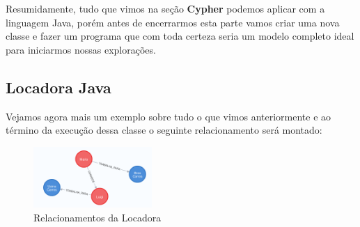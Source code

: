 Resumidamente, tudo que vimos na seção \textbf{Cypher} podemos aplicar com a linguagem Java, porém antes de encerrarmos esta parte vamos criar uma nova classe e fazer um programa que com toda certeza seria um modelo completo ideal para iniciarmos nossas explorações.

\subsection{Locadora Java}
Vejamos agora mais um exemplo sobre tudo o que vimos anteriormente e ao término da execução dessa classe o seguinte relacionamento será montado:
\begin{figure}[H]
	\centering
	\includegraphics[width=0.4\textwidth]{imagens/locadora}
	\caption{Relacionamentos da Locadora}
\end{figure}

